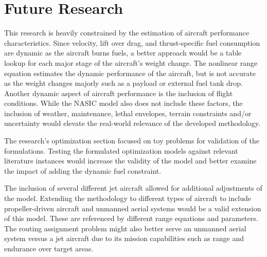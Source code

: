 \section{Future Research}
This research is heavily constrained by the estimation of aircraft performance characteristics. Since velocity, lift over drag, and thrust-specific fuel consumption are dynamic as the aircraft burns fuels, a better approach would be a table lookup for each major stage of the aircraft's weight change. The nonlinear range equation estimates the dynamic performance of the aircraft, but is not accurate as the weight changes majorly such as a payload or external fuel tank drop. Another dynamic aspect of aircraft performance is the inclusion of flight conditions. While the NASIC model also does not include these factors, the inclusion of weather, maintenance, lethal envelopes, terrain constraints and/or uncertainty would elevate the real-world relevance of the developed methodology. \par
The research's optimization section focused on toy problems for validation of the formulations. Testing the formulated optimization models against relevant literature instances would increase the validity of the model and better examine the impact of adding the dynamic fuel constraint. \par
The inclusion of several different jet aircraft allowed for additional adjustments of the model. Extending the methodology to different types of aircraft to include propeller-driven aircraft and unmanned aerial systems would be a valid extension of this model. These are referenced by different range equations and parameters. The routing assignment problem might also better serve an unmanned aerial system versus a jet aircraft due to its mission capabilities such as range and endurance over target areas.
